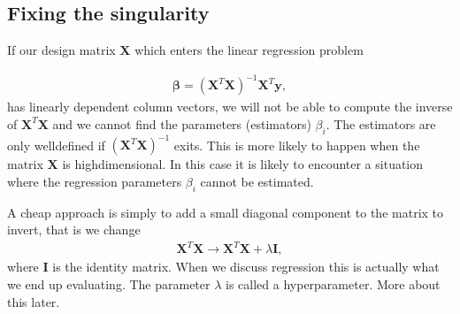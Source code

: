 \documentclass[letterpaper,10pt,english]{sphinxmanual}
\begin{document}
\subsection{Fixing the singularity}
\label{\detokenize{chapter4:fixing-the-singularity}}
If our design matrix \(\boldsymbol{X}\) which enters the linear regression problem




\begin{equation*}
\begin{split}
\begin{equation}
\boldsymbol{\beta}  =  (\boldsymbol{X}^{T} \boldsymbol{X})^{-1} \boldsymbol{X}^{T} \boldsymbol{y},
\label{_auto1} \tag{1}
\end{equation}
\end{split}
\end{equation*}
has linearly dependent column vectors, we will not be able to compute the inverse
of \(\boldsymbol{X}^T\boldsymbol{X}\) and we cannot find the parameters (estimators) \(\beta_i\).
The estimators are only well\sphinxhyphen{}defined if \((\boldsymbol{X}^{T}\boldsymbol{X})^{-1}\) exits.
This is more likely to happen when the matrix \(\boldsymbol{X}\) is high\sphinxhyphen{}dimensional. In this case it is likely to encounter a situation where
the regression parameters \(\beta_i\) cannot be estimated.

A cheap   approach is  simply to add a small diagonal component to the matrix to invert, that is we change
\begin{equation*}
\begin{split}
\boldsymbol{X}^{T} \boldsymbol{X} \rightarrow \boldsymbol{X}^{T} \boldsymbol{X}+\lambda \boldsymbol{I},
\end{split}
\end{equation*}
where \(\boldsymbol{I}\) is the identity matrix.  When we discuss  regression this is actually what we end up evaluating. The parameter \(\lambda\) is called a hyperparameter. More about this later.
\end{document}
